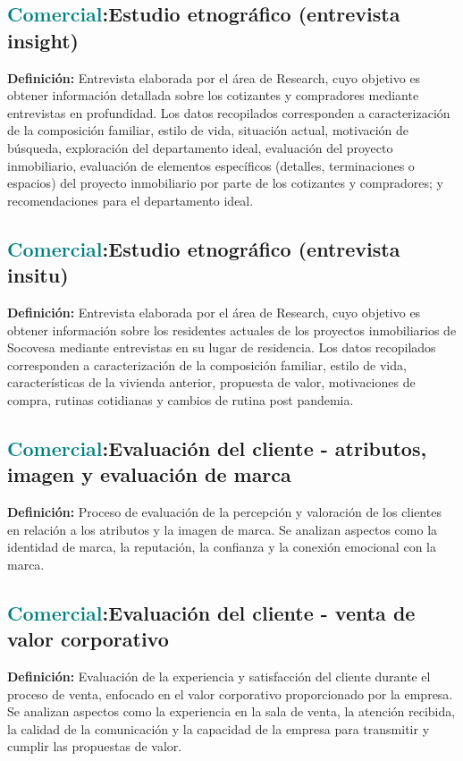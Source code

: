 \documentclass[12pt]{article}
\begin{document}
\subsection{\textcolor{teal}{Comercial}:{Estudio etnográfico (entrevista insight)}}
\textbf{Definición:} Entrevista elaborada por el área de Research, cuyo objetivo es obtener información detallada sobre los cotizantes y compradores mediante entrevistas en profundidad. Los datos recopilados corresponden a caracterización de la composición familiar, estilo de vida, situación actual, motivación de búsqueda, exploración del departamento ideal, evaluación del proyecto inmobiliario, evaluación de elementos específicos (detalles, terminaciones o espacios) del proyecto inmobiliario por parte de los cotizantes y compradores; y recomendaciones para el departamento ideal.
\subsection{\textcolor{teal}{Comercial}:{Estudio etnográfico (entrevista insitu)}}
\textbf{Definición:} Entrevista elaborada por el área de Research, cuyo objetivo es obtener información sobre los residentes actuales de los proyectos inmobiliarios de Socovesa mediante entrevistas en su lugar de residencia. Los datos recopilados corresponden a caracterización de la composición familiar, estilo de vida, características de la vivienda anterior, propuesta de valor, motivaciones de compra, rutinas cotidianas y cambios de rutina post pandemia.
\subsection{\textcolor{teal}{Comercial}:{Evaluación del cliente - atributos, imagen y evaluación de marca}}
\textbf{Definición:} Proceso de evaluación de la percepción y valoración de los clientes en relación a los atributos y la imagen de marca. Se analizan aspectos como la identidad de marca, la reputación, la confianza y la conexión emocional con la marca.
\subsection{\textcolor{teal}{Comercial}:{Evaluación del cliente - venta de valor corporativo}}
\textbf{Definición:} Evaluación de la experiencia y satisfacción del cliente durante el proceso de venta, enfocado en el valor corporativo proporcionado por la empresa. Se analizan aspectos como la experiencia en la sala de venta, la atención recibida, la calidad de la comunicación y la capacidad de la empresa para transmitir y cumplir las propuestas de valor.
\end{document}
